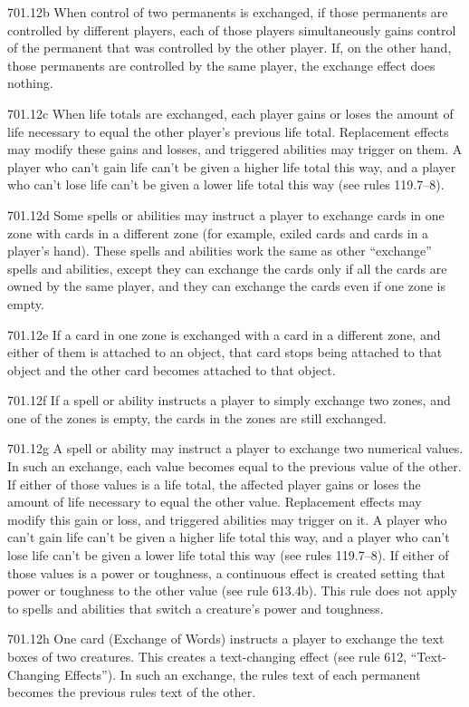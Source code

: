 701.12b When control of two permanents is exchanged, if those permanents are controlled by different players, each of those players simultaneously gains control of the permanent that was controlled by the other player. If, on the other hand, those permanents are controlled by the same player, the exchange effect does nothing.

701.12c When life totals are exchanged, each player gains or loses the amount of life necessary to equal the other player’s previous life total. Replacement effects may modify these gains and losses, and triggered abilities may trigger on them. A player who can’t gain life can’t be given a higher life total this way, and a player who can’t lose life can’t be given a lower life total this way (see rules 119.7–8).

701.12d Some spells or abilities may instruct a player to exchange cards in one zone with cards in a different zone (for example, exiled cards and cards in a player’s hand). These spells and abilities work the same as other “exchange” spells and abilities, except they can exchange the cards only if all the cards are owned by the same player, and they can exchange the cards even if one zone is empty.

701.12e If a card in one zone is exchanged with a card in a different zone, and either of them is attached to an object, that card stops being attached to that object and the other card becomes attached to that object.

701.12f If a spell or ability instructs a player to simply exchange two zones, and one of the zones is empty, the cards in the zones are still exchanged.

701.12g A spell or ability may instruct a player to exchange two numerical values. In such an exchange, each value becomes equal to the previous value of the other. If either of those values is a life total, the affected player gains or loses the amount of life necessary to equal the other value. Replacement effects may modify this gain or loss, and triggered abilities may trigger on it. A player who can’t gain life can’t be given a higher life total this way, and a player who can’t lose life can’t be given a lower life total this way (see rules 119.7–8). If either of those values is a power or toughness, a continuous effect is created setting that power or toughness to the other value (see rule 613.4b). This rule does not apply to spells and abilities that switch a creature’s power and toughness.

701.12h One card (Exchange of Words) instructs a player to exchange the text boxes of two creatures. This creates a text-changing effect (see rule 612, “Text-Changing Effects”). In such an exchange, the rules text of each permanent becomes the previous rules text of the other.

